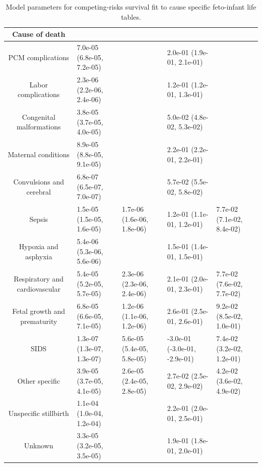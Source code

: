 \begin{table}[t]
\caption*{
{\fontsize{20}{25}\selectfont  Model parameters for competing-risks survival fit to cause specific feto-infant life tables.\fontsize{12}{15}\selectfont }
} 
\fontsize{12.0pt}{14.0pt}\selectfont
\begin{tabular*}{\linewidth}{@{\extracolsep{\fill}}cllll}
\toprule
Cause of death &  &  &  &  \\ 
\midrule\addlinespace[2.5pt]
PCM complications & 7.0e-05 (6.8e-05, 7.2e-05) &  & 2.0e-01 (1.9e-01, 2.1e-01) &  \\ 
Labor complications & 2.3e-06 (2.2e-06, 2.4e-06) &  & 1.2e-01 (1.2e-01, 1.3e-01) &  \\ 
Congenital malformations & 3.8e-05 (3.7e-05, 4.0e-05) &  & 5.0e-02 (4.8e-02, 5.3e-02) &  \\ 
Maternal conditions & 8.9e-05 (8.8e-05, 9.1e-05) &  & 2.2e-01 (2.2e-01, 2.2e-01) &  \\ 
Convulsions and cerebral & 6.8e-07 (6.5e-07, 7.0e-07) &  & 5.7e-02 (5.5e-02, 5.8e-02) &  \\ 
Sepsis & 1.5e-05 (1.5e-05, 1.6e-05) & 1.7e-06 (1.6e-06, 1.8e-06) & 1.2e-01 (1.1e-01, 1.2e-01) & 7.7e-02 (7.1e-02, 8.4e-02) \\ 
Hypoxia and asphyxia & 5.4e-06 (5.3e-06, 5.6e-06) &  & 1.5e-01 (1.4e-01, 1.5e-01) &  \\ 
Respiratory and cardiovascular & 5.4e-05 (5.2e-05, 5.7e-05) & 2.3e-06 (2.3e-06, 2.4e-06) & 2.1e-01 (2.0e-01, 2.3e-01) & 7.7e-02 (7.6e-02, 7.7e-02) \\ 
Fetal growth and prematurity & 6.8e-05 (6.6e-05, 7.1e-05) & 1.2e-06 (1.1e-06, 1.2e-06) & 2.6e-01 (2.5e-01, 2.6e-01) & 9.2e-02 (8.5e-02, 1.0e-01) \\ 
SIDS & 1.3e-07 (1.3e-07, 1.3e-07) & 5.6e-05 (5.4e-05, 5.8e-05) & -3.0e-01 (-3.0e-01, -2.9e-01) & 7.4e-02 (3.2e-02, 1.2e-01) \\ 
Other specific & 3.9e-05 (3.7e-05, 4.1e-05) & 2.6e-05 (2.4e-05, 2.8e-05) & 2.7e-02 (2.5e-02, 2.9e-02) & 4.2e-02 (3.6e-02, 4.9e-02) \\ 
Unspecific stillbirth & 1.1e-04 (1.0e-04, 1.2e-04) &  & 2.2e-01 (2.0e-01, 2.5e-01) &  \\ 
Unknown & 3.3e-05 (3.2e-05, 3.5e-05) &  & 1.9e-01 (1.8e-01, 2.0e-01) &  \\ 
\bottomrule
\end{tabular*}
\end{table}

\newpage

